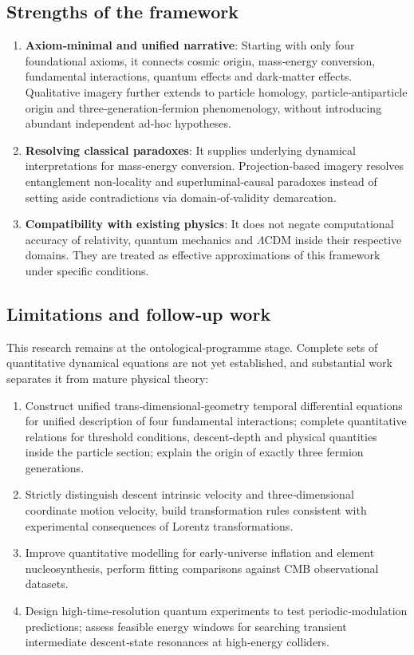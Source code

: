 \documentclass[12pt,a4paper]{article}
\begin{document}
\subsection{Strengths of the framework}
\begin{enumerate}
\item \textbf{Axiom‑minimal and unified narrative}: Starting with only four foundational axioms, it connects cosmic origin, mass‑energy conversion, fundamental interactions, quantum effects and dark‑matter effects. Qualitative imagery further extends to particle homology, particle‑antiparticle origin and three‑generation‑fermion phenomenology, without introducing abundant independent ad‑hoc hypotheses.
\item \textbf{Resolving classical paradoxes}: It supplies underlying dynamical interpretations for mass‑energy conversion. Projection‑based imagery resolves entanglement non‑locality and superluminal‑causal paradoxes instead of setting aside contradictions via domain‑of‑validity demarcation.
\item \textbf{Compatibility with existing physics}: It does not negate computational accuracy of relativity, quantum mechanics and $\Lambda$CDM inside their respective domains. They are treated as effective approximations of this framework under specific conditions.
\end{enumerate}

\subsection{Limitations and follow‑up work}
This research remains at the ontological‑programme stage. Complete sets of quantitative dynamical equations are not yet established, and substantial work separates it from mature physical theory:
\begin{enumerate}
\item Construct unified trans‑dimensional‑geometry temporal differential equations for unified description of four fundamental interactions; complete quantitative relations for threshold conditions, descent‑depth and physical quantities inside the particle section; explain the origin of exactly three fermion generations.
\item Strictly distinguish descent intrinsic velocity and three‑dimensional coordinate motion velocity, build transformation rules consistent with experimental consequences of Lorentz transformations.
\item Improve quantitative modelling for early‑universe inflation and element nucleosynthesis, perform fitting comparisons against CMB observational datasets.
\item Design high‑time‑resolution quantum experiments to test periodic‑modulation predictions; assess feasible energy windows for searching transient intermediate descent‑state resonances at high‑energy colliders.
\end{enumerate}
\end{document}
